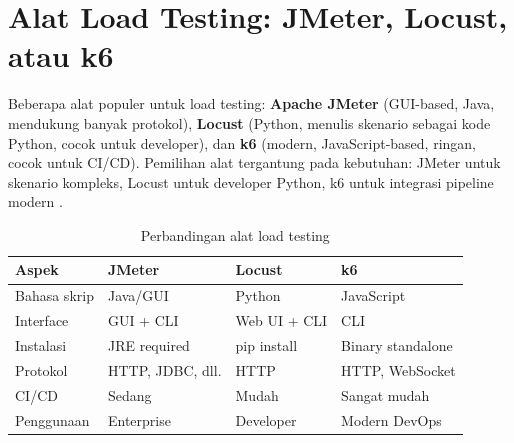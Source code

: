 \section{Alat Load Testing: JMeter, Locust, atau k6}

Beberapa alat populer untuk load testing: \textbf{Apache JMeter} (GUI-based, Java, mendukung banyak protokol), \textbf{Locust} (Python, menulis skenario sebagai kode Python, cocok untuk developer), dan \textbf{k6} (modern, JavaScript-based, ringan, cocok untuk CI/CD). Pemilihan alat tergantung pada kebutuhan: JMeter untuk skenario kompleks, Locust untuk developer Python, k6 untuk integrasi pipeline modern \cite{mdnToolsTesting}.

\begin{table}[ht]
\centering
\begin{tabular}{|P{2.5cm}|P{3cm}|P{3.5cm}|P{3.5cm}|}
\hline
\textbf{Aspek} & \textbf{JMeter} & \textbf{Locust} & \textbf{k6} \\
\hline
Bahasa skrip & Java/GUI & Python & JavaScript \\
\hline
Interface & GUI + CLI & Web UI + CLI & CLI \\
\hline
Instalasi & JRE required & pip install & Binary standalone \\
\hline
Protokol & HTTP, JDBC, dll. & HTTP & HTTP, WebSocket \\
\hline
CI/CD & Sedang & Mudah & Sangat mudah \\
\hline
Penggunaan & Enterprise & Developer & Modern DevOps \\
\hline
\end{tabular}
\caption{Perbandingan alat load testing}
\end{table}

